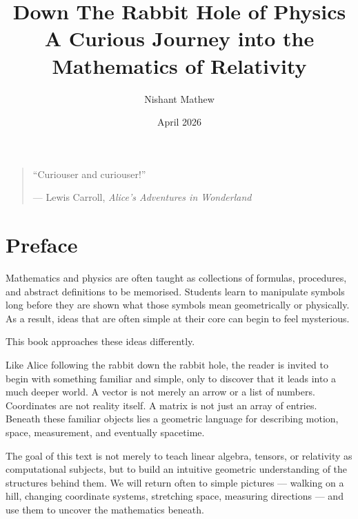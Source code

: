 \documentclass[11pt,openany]{book}
\title{\Huge Down The Rabbit Hole of Physics\\[0.5em]
\Large A Curious Journey into the Mathematics of Relativity}
\author{Nishant Mathew}
\date{April 2026}
\theoremstyle{definition}
\begin{document}
\frontmatter

\maketitle


\vspace*{0.3\textheight}

\begin{quote}
\centering
``Curiouser and curiouser!''

\medskip

--- Lewis Carroll, \textit{Alice's Adventures in Wonderland}
\end{quote}

\vspace{1cm}





\chapter*{Preface}

Mathematics and physics are often taught as collections of formulas, procedures, and 
abstract definitions to be memorised. Students learn to manipulate symbols long before 
they are shown what those symbols mean geometrically or physically. As a result, ideas 
that are often simple at their core can begin to feel mysterious.

\medskip

This book approaches these ideas differently.

\medskip

Like Alice following the rabbit down the rabbit hole, the reader is invited to begin with 
something familiar and simple, only to discover that it leads into a much deeper world. 
A vector is not merely an arrow or a list of numbers. Coordinates are not reality itself. 
A matrix is not just an array of entries. Beneath these familiar objects lies a geometric 
language for describing motion, space, measurement, and eventually spacetime.

\medskip

The goal of this text is not merely to teach linear algebra, tensors, or relativity as 
computational subjects, but to build an intuitive geometric understanding of the structures 
behind them. We will return often to simple pictures --- walking on a hill, changing 
coordinate systems, stretching space, measuring directions --- and use them to uncover 
the mathematics beneath.
\end{document}
